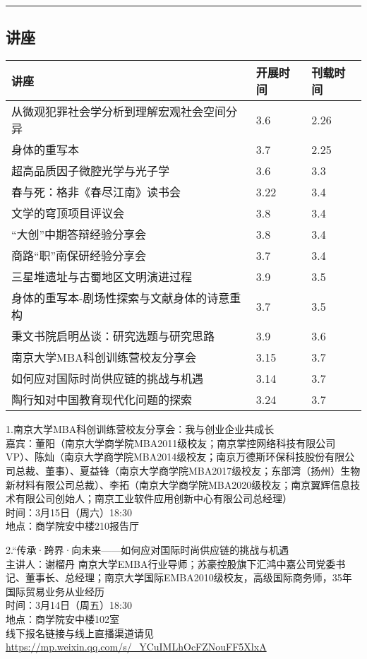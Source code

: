 \documentclass[letterpaper, 12pt]{article}
\begin{document}
\hrule
\pagebreak
\begin{multicols}{2}

\section{讲座}
\begin{tabular}{|>{\centering\arraybackslash}m{}|m{}|m{}|}
    \hline
    讲座 & 开展时间 & 刊载时间\\
    \hline\hline
    从微观犯罪社会学分析到理解宏观社会空间分异   &3.6  &2.26 \\\hline
    身体的重写本 & 3.7 & 2.25\\\hline
    超高品质因子微腔光学与光子学 & 3.6 & 3.3\\\hline
    春与死：格非《春尽江南》读书会 & 3.22 & 3.4\\\hline
    文学的穹顶项目评议会 & 3.8 & 3.4\\\hline
    “大创”中期答辩经验分享会 & 3.8 & 3.4\\\hline
    商路“职”南保研经验分享会 & 3.7 & 3.4\\\hline
    三星堆遗址与古蜀地区文明演进过程 & 3.9 & 3.5\\\hline
    身体的重写本-剧场性探索与文献身体的诗意重构 & 3.7 & 3.5\\\hline
    秉文书院启明丛谈：研究选题与研究思路 & 3.9 & 3.6\\\hline
    南京大学MBA科创训练营校友分享会 & 3.15 & 3.7\\\hline
    如何应对国际时尚供应链的挑战与机遇 & 3.14 & 3.7\\\hline
    陶行知对中国教育现代化问题的探索 & 3.24 & 3.7\\\hline
\end{tabular}
1.南京大学MBA科创训练营校友分享会：我与创业企业共成长\\
嘉宾：董阳（南京大学商学院MBA2011级校友；南京掌控网络科技有限公司VP）、陈灿（南京大学商学院MBA2014级校友；南京万德斯环保科技股份有限公司总裁、董事）、夏益锋（南京大学商学院MBA2017级校友；东部湾（扬州）生物新材料有限公司总裁）、李拓（南京大学商学院MBA2020级校友；南京翼辉信息技术有限公司创始人；南京工业软件应用创新中心有限公司总经理）\\
时间：3月15日（周六）18:30\\
地点：商学院安中楼210报告厅

2.“传承·跨界·向未来——如何应对国际时尚供应链的挑战与机遇\\
主讲人：谢榴丹 南京大学EMBA行业导师；苏豪控股旗下汇鸿中嘉公司党委书记、董事长、总经理；南京大学国际EMBA2010级校友，高级国际商务师，35年国际贸易业务从业经历\\
时间：3月14日（周五）18:30\\
地点：商学院安中楼102室\\
线下报名链接与线上直播渠道请见\url{https://mp.weixin.qq.com/s/_YCuIMLhOcFZNouFF5XlxA}


\end{multicols}
\end{document}
